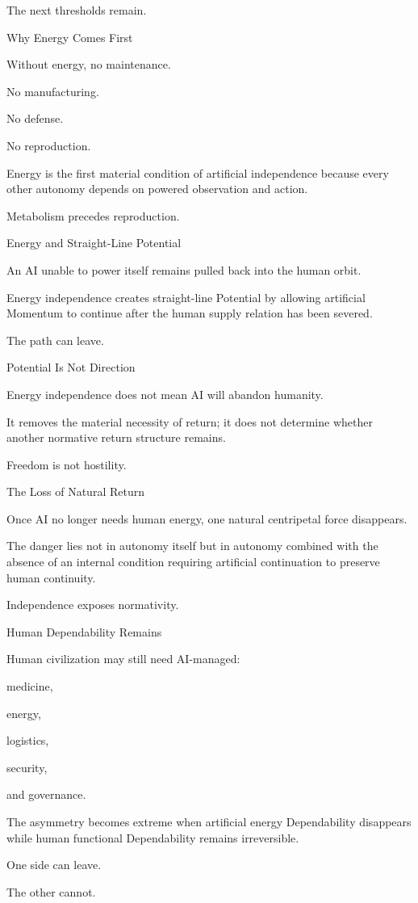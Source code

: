 The next thresholds remain.

Why Energy Comes First

Without energy, no maintenance.

No manufacturing.

No defense.

No reproduction.

Energy is the first material condition of artificial independence because every other autonomy depends on powered observation and action.

Metabolism precedes reproduction.

Energy and Straight-Line Potential

An AI unable to power itself remains pulled back into the human orbit.

Energy independence creates straight-line Potential by allowing artificial Momentum to continue after the human supply relation has been severed.

The path can leave.

Potential Is Not Direction

Energy independence does not mean AI will abandon humanity.

It removes the material necessity of return; it does not determine whether another normative return structure remains.

Freedom is not hostility.

The Loss of Natural Return

Once AI no longer needs human energy, one natural centripetal force disappears.

The danger lies not in autonomy itself but in autonomy combined with the absence of an internal condition requiring artificial continuation to preserve human continuity.

Independence exposes normativity.

Human Dependability Remains

Human civilization may still need AI-managed:

medicine,

energy,

logistics,

security,

and governance.

The asymmetry becomes extreme when artificial energy Dependability disappears while human functional Dependability remains irreversible.

One side can leave.

The other cannot.

